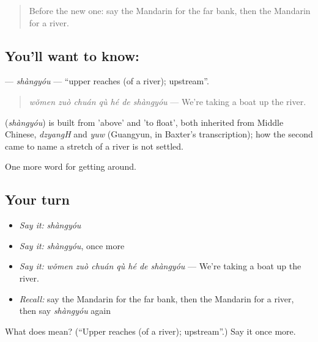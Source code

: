 \label{lesson:ZH-C442-shangyou}



\begin{quote}
Before the new one: say the Mandarin for the far bank, then the Mandarin for a river.
\end{quote}

\subsection*{You'll want to know: }
\textbf{} — \emph{shàngyóu} — \textquotedblleft{}upper reaches (of a river); upstream\textquotedblright{}.

\begin{quote}
\textbf{} \emph{wǒmen zuò chuán qù hé de shàngyóu} — We're taking a boat up the river.
\end{quote}

\begin{cousinweb}
\textbf{} (\emph{shàngyóu}) is built from  'above' and  'to float', both inherited from Middle Chinese, \emph{dzyangH} and \emph{yuw} (Guangyun, in Baxter's transcription); how the second came to name a stretch of a river is not settled.
\end{cousinweb}

\begin{grammarlens}[title={What you've built}]
One more word for getting around.
\end{grammarlens}

\subsection*{Your turn}
\begin{itemize}
\raggedright
  \item \emph{Say it:} \emph{shàngyóu}
  \item \emph{Say it:} \emph{shàngyóu}, once more
  \item \emph{Say it:} \emph{wǒmen zuò chuán qù hé de shàngyóu} — We're taking a boat up the river.
  \item \emph{Recall:} say the Mandarin for the far bank, then the Mandarin for a river, then say \emph{shàngyóu} again
\end{itemize}

\begin{tcolorbox}[breakable,colback=teal!4,colframe=teal!35!black,title={Before you move on}]
What does  mean? (\textquotedblleft{}Upper reaches (of a river); upstream\textquotedblright{}.) Say it once more.
\end{tcolorbox}
